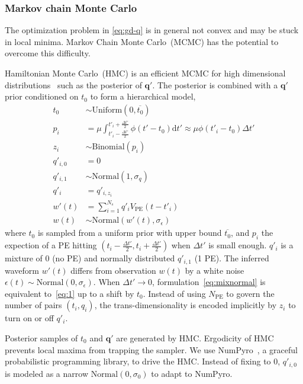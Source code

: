 \subsubsection{Markov chain Monte Carlo}
\label{subsec:mcmc}
The optimization problem in \eqref{eq:gd-q} is in general not convex and may be stuck in local minima.  Markov Chain Monte Carlo~(MCMC) has the potential to overcome this difficulty.

Hamiltonian Monte Carlo~(HMC) is an efficient MCMC for high dimensional distributions~\cite{neal_mcmc_2012} such as the posterior of $\bm{q'}$.  The posterior is combined with a $\bm{q'}$ prior conditioned on $t_0$ to form a hierarchical model,
\begin{equation}
  \begin{aligned}
    t_{0} &\sim \mathrm{Uniform}(0, \overline{t_0}) \\
    p_i &= \mu \int_{t'_i-\frac{\Delta t'}{2}}^{t'_i+\frac{\Delta t'}{2}} \phi(t' - t_0)\mathrm{d}t' \approx \mu\phi(t'_i - t_0)\Delta{t'}  \\
    z_i &\sim \mathrm{Binomial}(p_i) \\
    q'_{i,0}&=0\\
    q'_{i,1}& \sim \mathrm{Normal}(1, \sigma_q)\\
    q'_i &= q'_{i,z_i}\\
    w'(t) & = \sum_{i=1}^{N_s}q'_iV_\mathrm{PE}(t-t'_i)\\
    w(t) &\sim \mathrm{Normal}(w'(t), \sigma_\epsilon)
  \end{aligned}
  \label{eq:mixnormal}
\end{equation}
where $t_{0}$ is sampled from a uniform prior with upper bound $\overline{t_{0}}$, and $p_i$ the expection of a PE hitting $(t_{i} - \frac{\Delta t'}{2}, t_{i} + \frac{\Delta t'}{2})$ when $\Delta t'$ is small enough. $q'_i$ is a mixture of 0 (no PE) and normally distributed $q'_{i,1}$ (1 PE).  The inferred waveform $w'(t)$ differs from observation $w(t)$ by a white noise $\epsilon(t) \sim \mathrm{Normal}(0, \sigma_\epsilon)$.  When $\Delta{t'} \to 0$, formulation~\eqref{eq:mixnormal} is equivalent to~\eqref{eq:1} up to a shift by $t_0$.  Instead of using $N_\mathrm{PE}$ to govern the number of pairs $(t_i, q_i)$, the trans-dimensionality is encoded implicitly by $z_i$ to turn on or off $q'_i$.

Posterior samples of $t_0$ and $\bm{q'}$ are generated by HMC.   Ergodicity of HMC prevents local maxima from trapping the sampler.  We use NumPyro~\cite{phan2019composable}, a graceful probabilistic programming library, to drive the HMC.  Instead of fixing to 0, $q'_{i,0}$ is modeled as a narrow $\mathrm{Normal}(0, \sigma_0)$ to adapt to NumPyro.

